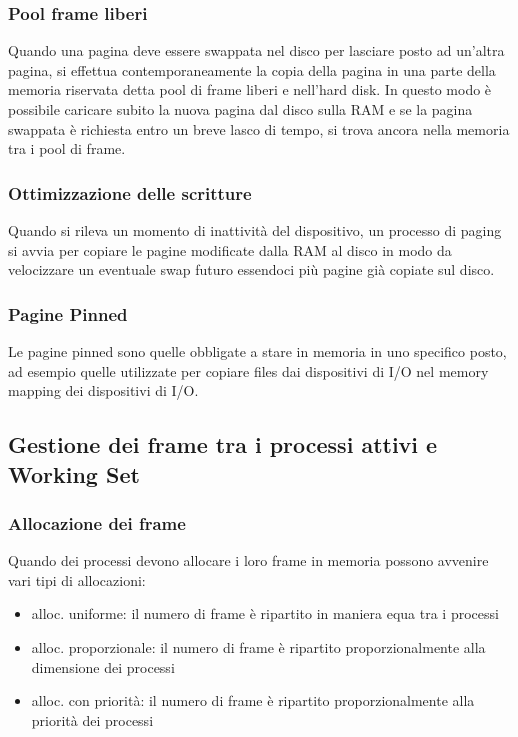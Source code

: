 \documentclass[a4paper]{article}
\begin{document}
\subsubsection*{Pool frame liberi}
Quando una pagina deve essere swappata nel disco per lasciare posto ad un'altra pagina, si effettua contemporaneamente la copia
della pagina in una parte della memoria riservata detta pool di frame liberi e nell'hard disk. In questo modo è possibile caricare
subito la nuova pagina dal disco sulla RAM e se la pagina swappata è richiesta entro un breve lasco di tempo, si trova ancora
nella memoria tra i pool di frame.

\subsubsection*{Ottimizzazione delle scritture}
Quando si rileva un momento di inattività del dispositivo, un processo di paging si avvia per copiare le pagine modificate dalla
RAM al disco in modo da velocizzare un eventuale swap futuro essendoci più pagine già copiate sul disco.

\subsubsection*{Pagine Pinned}
Le pagine pinned sono quelle obbligate a stare in memoria in uno specifico posto, ad esempio quelle utilizzate per copiare files
dai dispositivi di I/O nel memory mapping dei dispositivi di I/O.

\newpage


\subsection{Gestione dei frame tra i processi attivi e Working Set}
\subsubsection*{Allocazione dei frame}
Quando dei processi devono allocare i loro frame in memoria possono avvenire vari tipi di allocazioni:
\begin{itemize}
	\item alloc. uniforme: il numero di frame è ripartito in maniera equa tra i processi
	\item alloc. proporzionale: il numero di frame è ripartito proporzionalmente alla dimensione dei processi
	\item alloc. con priorità: il numero di frame è ripartito proporzionalmente alla priorità dei processi
\end{itemize}
\end{document}
